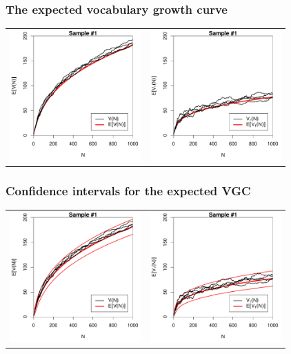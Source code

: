 \documentclass[handout,notes=show,t]{beamer} %
\begin{document}
\begin{frame}
  \frametitle{The expected vocabulary growth curve}

  \ungap[1]
  \begin{center}
    \begin{tabular}{c @{} c}
      \includegraphics[width=50mm]{img/02-samples-vgc-exp-vs-samples} &
      \includegraphics[width=50mm]{img/02-samples-vgc-V1-exp-vs-samples}
    \end{tabular}
  \end{center}
\end{frame}

\begin{frame}
  \frametitle{Confidence intervals for the expected VGC}

  \ungap[1]
  \begin{center}
    \begin{tabular}{c @{} c}
      \includegraphics[width=50mm]{img/02-samples-vgc-exp-vs-samples-conf} &
      \includegraphics[width=50mm]{img/02-samples-vgc-V1-exp-vs-samples-conf}
    \end{tabular}
  \end{center}
\end{frame}
\end{document}
